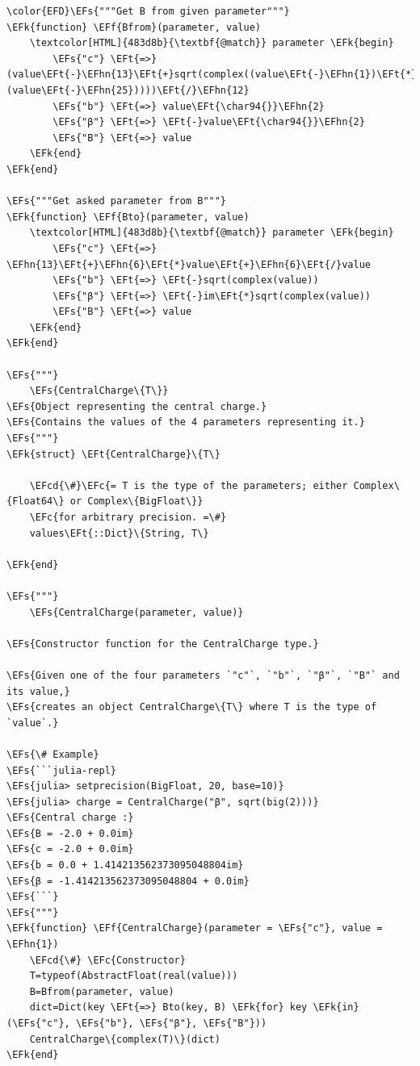 \documentclass[a4paper]{article}
\numberwithin{equation}{section}
\newcommand{\EFc}[1]{\textcolor{EFc}{#1}} %
\newcommand{\EFcd}[1]{\textcolor{EFcd}{#1}} %
\newcommand{\EFs}[1]{\textcolor{EFs}{#1}} %
\newcommand{\EFk}[1]{\textcolor{EFk}{#1}} %
\newcommand{\EFf}[1]{\textcolor{EFf}{#1}} %
\newcommand{\EFt}[1]{\textcolor{EFt}{#1}} %
\newcommand{\EFhn}[1]{\textcolor{EFhn}{#1}} %
\begin{document}
\begin{Code}
\begin{Verbatim}
\color{EFD}\EFs{"""Get B from given parameter"""}
\EFk{function} \EFf{Bfrom}(parameter, value)
    \textcolor[HTML]{483d8b}{\textbf{@match}} parameter \EFk{begin}
        \EFs{"c"} \EFt{=>} (value\EFt{-}\EFhn{13}\EFt{+}sqrt(complex((value\EFt{-}\EFhn{1})\EFt{*}(value\EFt{-}\EFhn{25}))))\EFt{/}\EFhn{12}
        \EFs{"b"} \EFt{=>} value\EFt{\char94{}}\EFhn{2}
        \EFs{"β"} \EFt{=>} \EFt{-}value\EFt{\char94{}}\EFhn{2}
        \EFs{"B"} \EFt{=>} value
    \EFk{end}
\EFk{end}

\EFs{"""Get asked parameter from B"""}
\EFk{function} \EFf{Bto}(parameter, value)
    \textcolor[HTML]{483d8b}{\textbf{@match}} parameter \EFk{begin}
        \EFs{"c"} \EFt{=>} \EFhn{13}\EFt{+}\EFhn{6}\EFt{*}value\EFt{+}\EFhn{6}\EFt{/}value
        \EFs{"b"} \EFt{=>} \EFt{-}sqrt(complex(value))
        \EFs{"β"} \EFt{=>} \EFt{-}im\EFt{*}sqrt(complex(value))
        \EFs{"B"} \EFt{=>} value
    \EFk{end}
\EFk{end}

\EFs{"""}
    \EFs{CentralCharge\{T\}}
\EFs{Object representing the central charge.}
\EFs{Contains the values of the 4 parameters representing it.}
\EFs{"""}
\EFk{struct} \EFt{CentralCharge}\{T\}

    \EFcd{\#}\EFc{= T is the type of the parameters; either Complex\{Float64\} or Complex\{BigFloat\}}
    \EFc{for arbitrary precision. =\#}
    values\EFt{::Dict}\{String, T\}

\EFk{end}

\EFs{"""}
    \EFs{CentralCharge(parameter, value)}

\EFs{Constructor function for the CentralCharge type.}

\EFs{Given one of the four parameters `"c"`, `"b"`, `"β"`, `"B"` and its value,}
\EFs{creates an object CentralCharge\{T\} where T is the type of `value`.}

\EFs{\# Example}
\EFs{```julia-repl}
\EFs{julia> setprecision(BigFloat, 20, base=10)}
\EFs{julia> charge = CentralCharge("β", sqrt(big(2)))}
\EFs{Central charge :}
\EFs{B = -2.0 + 0.0im}
\EFs{c = -2.0 + 0.0im}
\EFs{b = 0.0 + 1.414213562373095048804im}
\EFs{β = -1.414213562373095048804 + 0.0im}
\EFs{```}
\EFs{"""}
\EFk{function} \EFf{CentralCharge}(parameter = \EFs{"c"}, value = \EFhn{1})
    \EFcd{\#} \EFc{Constructor}
    T=typeof(AbstractFloat(real(value)))
    B=Bfrom(parameter, value)
    dict=Dict(key \EFt{=>} Bto(key, B) \EFk{for} key \EFk{in} (\EFs{"c"}, \EFs{"b"}, \EFs{"β"}, \EFs{"B"}))
    CentralCharge\{complex(T)\}(dict)
\EFk{end}
\end{Verbatim}
\end{Code}
\end{document}
